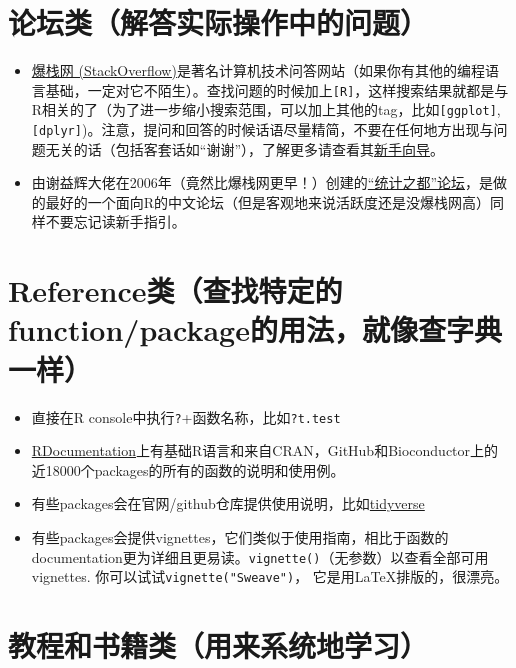 \documentclass[]{book}
\providecommand{\tightlist}{%
  \setlength{\itemsep}{0pt}\setlength{\parskip}{0pt}}
\begin{document}
\section{论坛类（解答实际操作中的问题）}

\begin{itemize}
\tightlist
\item
  \href{https://stackoverflow.com}{爆栈网 (StackOverflow)}是著名计算机技术问答网站（如果你有其他的编程语言基础，一定对它不陌生）。查找问题的时候加上\texttt{{[}R{]}}，这样搜索结果就都是与R相关的了（为了进一步缩小搜索范围，可以加上其他的tag，比如\texttt{{[}ggplot{]}}, \texttt{{[}dplyr{]}})。注意，提问和回答的时候话语尽量精简，不要在任何地方出现与问题无关的话（包括客套话如``谢谢''），了解更多请查看其\href{https://stackoverflow.com/tour}{新手向导}。
\item
  由谢益辉大佬在2006年（竟然比爆栈网更早！）创建的\href{https://d.cosx.org}{``统计之都''论坛}，是做的最好的一个面向R的中文论坛（但是客观地来说活跃度还是没爆栈网高）同样不要忘记读新手指引。
\end{itemize}

\hypertarget{referencefunctionpackage}{%
\section{Reference类（查找特定的function/package的用法，就像查字典一样）}\label{referencefunctionpackage}}

\begin{itemize}
\tightlist
\item
  直接在R console中执行\texttt{?}+函数名称，比如\texttt{?t.test}
\item
  \href{https://www.rdocumentation.org}{RDocumentation}上有基础R语言和来自CRAN，GitHub和Bioconductor上的近18000个packages的所有的函数的说明和使用例。
\item
  有些packages会在官网/github仓库提供使用说明，比如\href{https://www.tidyverse.org}{tidyverse}
\item
  有些packages会提供vignettes，它们类似于使用指南，相比于函数的documentation更为详细且更易读。\texttt{vignette()}（无参数）以查看全部可用vignettes. 你可以试试\texttt{vignette("Sweave")}， 它是用LaTeX排版的，很漂亮。
\end{itemize}

\section{教程和书籍类（用来系统地学习）}
\end{document}

